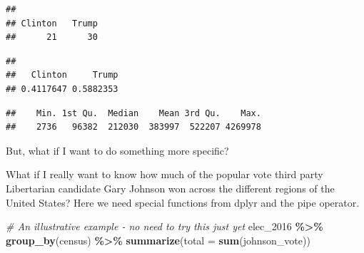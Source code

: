 \documentclass[
]{book}
\newenvironment{Shaded}{\begin{snugshade}}{\end{snugshade}}
\newcommand{\AttributeTok}[1]{\textcolor[rgb]{0.13,0.29,0.53}{#1}}
\newcommand{\CommentTok}[1]{\textcolor[rgb]{0.56,0.35,0.01}{\textit{#1}}}
\newcommand{\FunctionTok}[1]{\textcolor[rgb]{0.13,0.29,0.53}{\textbf{#1}}}
\newcommand{\NormalTok}[1]{#1}
\newcommand{\SpecialCharTok}[1]{\textcolor[rgb]{0.81,0.36,0.00}{\textbf{#1}}}
\begin{document}
\begin{verbatim}
## 
## Clinton   Trump 
##      21      30
\end{verbatim}

\begin{Shaded}
\end{Shaded}

\begin{verbatim}
## 
##   Clinton     Trump 
## 0.4117647 0.5882353
\end{verbatim}

\begin{Shaded}
\end{Shaded}

\begin{verbatim}
##    Min. 1st Qu.  Median    Mean 3rd Qu.    Max. 
##    2736   96382  212030  383997  522207 4269978
\end{verbatim}

But, what if I want to do something more specific?

What if I really want to know how much of the popular vote third party Libertarian candidate Gary Johnson won across the different regions of the United States? Here we need special functions from dplyr and the pipe operator.

\begin{Shaded}
\begin{Highlighting}[]
\CommentTok{\# An illustrative example {-} no need to try this just yet}
\NormalTok{elec\_2016 }\SpecialCharTok{\%\textgreater{}\%}
  \FunctionTok{group\_by}\NormalTok{(census) }\SpecialCharTok{\%\textgreater{}\%}
  \FunctionTok{summarize}\NormalTok{(}\AttributeTok{total =} \FunctionTok{sum}\NormalTok{(johnson\_vote))}
\end{Highlighting}
\end{Shaded}
\end{document}
